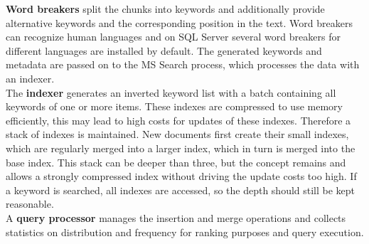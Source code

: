 \textbf{Word breakers} split the chunks into keywords and additionally provide alternative keywords and the corresponding position in the text. Word breakers can recognize human languages and on \ac{SQL} Server several word breakers for different languages are installed by default. The generated keywords and metadata are passed on to the \ac{MS} Search process, which processes the data with an indexer.\\
The \textbf{indexer} generates an inverted keyword list with a batch containing all keywords of one or more items. These indexes are compressed to use memory efficiently, this may lead to high costs for updates of these indexes. Therefore a stack of indexes is maintained. New documents first create their small indexes, which are regularly merged into a larger index, which in turn is merged into the base index. This stack can be deeper than three, but the concept remains and allows a strongly compressed index without driving the update costs too high. If a keyword is searched, all indexes are accessed, so the depth should still be kept reasonable.\\
A \textbf{query processor} manages the insertion and merge operations and collects statistics on distribution and frequency for ranking purposes and query execution. \parencite[cf.][pp. 8-9]{hamilton_microsoft_2001}
